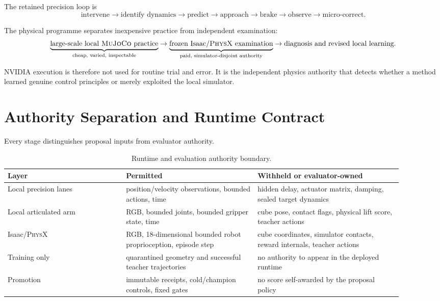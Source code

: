 \documentclass[11pt,a4paper]{article}
\newcommand{\PhysX}{\textsc{PhysX}}
\newcommand{\MuJoCo}{\textsc{MuJoCo}}
\begin{document}
The retained precision loop is
\begin{equation}
\text{intervene}
\rightarrow \text{identify dynamics}
\rightarrow \text{predict}
\rightarrow \text{approach}
\rightarrow \text{brake}
\rightarrow \text{observe}
\rightarrow \text{micro-correct}.
\label{eq:precision-loop}
\end{equation}

The physical programme separates inexpensive practice from independent
examination:
\begin{equation}
\underbrace{\text{large-scale local \MuJoCo{} practice}}_{\text{cheap, varied, inspectable}}
\rightarrow
\underbrace{\text{frozen Isaac/\PhysX{} examination}}_{\text{paid, simulator-disjoint authority}}
\rightarrow
\text{diagnosis and revised local learning}.
\label{eq:practice-exam}
\end{equation}

NVIDIA execution is therefore not used for routine trial and error.  It is the
independent physics authority that detects whether a method learned genuine
control principles or merely exploited the local simulator.

\section{Authority Separation and Runtime Contract}

Every stage distinguishes proposal inputs from evaluator authority.

\begin{table}[H]
\centering
\caption{Runtime and evaluation authority boundary.}
\begin{tabular}{>{\raggedright\arraybackslash}p{0.27\linewidth}
                >{\raggedright\arraybackslash}p{0.30\linewidth}
                >{\raggedright\arraybackslash}p{0.33\linewidth}}
\toprule
Layer & Permitted & Withheld or evaluator-owned \\
\midrule
Local precision lanes & position/velocity observations, bounded actions, time
& hidden delay, actuator matrix, damping, sealed target dynamics \\
Local articulated arm & RGB, bounded joints, bounded gripper state, time
& cube pose, contact flags, physical lift score, teacher actions \\
Isaac/\PhysX{} & RGB, 18-dimensional bounded robot proprioception, episode step
& cube coordinates, simulator contacts, reward internals, teacher actions \\
Training only & quarantined geometry and successful teacher trajectories
& no authority to appear in the deployed runtime \\
Promotion & immutable receipts, cold/champion controls, fixed gates
& no score self-awarded by the proposal policy \\
\bottomrule
\end{tabular}
\end{table}
\end{document}
